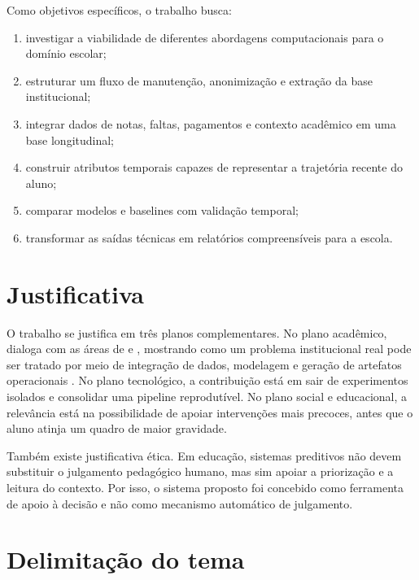Como objetivos espec\'ificos, o trabalho busca:

\begin{enumerate}
    \item investigar a viabilidade de diferentes abordagens computacionais para o dom\'inio escolar;
    \item estruturar um fluxo de manuten\c{c}\~ao, anonimiza\c{c}\~ao e extra\c{c}\~ao da base institucional;
    \item integrar dados de notas, faltas, pagamentos e contexto acad\^emico em uma base longitudinal;
    \item construir atributos temporais capazes de representar a trajet\'oria recente do aluno;
    \item comparar modelos e baselines com valida\c{c}\~ao temporal;
    \item transformar as sa\'idas t\'ecnicas em relat\'orios compreens\'iveis para a escola.
\end{enumerate}

\section{Justificativa}
\label{sec:justificativa}

O trabalho se justifica em tr\^es planos complementares. No plano acad\^emico, dialoga com as \'areas de  e , mostrando como um problema institucional real pode ser tratado por meio de integra\c{c}\~ao de dados, modelagem e gera\c{c}\~ao de artefatos operacionais \cite{romero2010, baker2014, siemens2012}. No plano tecnol\'ogico, a contribui\c{c}\~ao est\'a em sair de experimentos isolados e consolidar uma pipeline reprodut\'ivel. No plano social e educacional, a relev\^ancia est\'a na possibilidade de apoiar interven\c{c}\~oes mais precoces, antes que o aluno atinja um quadro de maior gravidade.

Tamb\'em existe justificativa \'etica. Em educa\c{c}\~ao, sistemas preditivos n\~ao devem substituir o julgamento pedag\'ogico humano, mas sim apoiar a prioriza\c{c}\~ao e a leitura do contexto. Por isso, o sistema proposto foi concebido como ferramenta de apoio \`a decis\~ao e n\~ao como mecanismo autom\'atico de julgamento.

\section{Delimita\c{c}\~ao do tema}
\label{sec:delimitacao}

